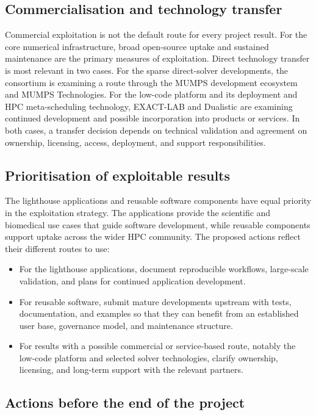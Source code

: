 \documentclass[a4paper,12pt]{article}
\begin{document}
\subsection{Commercialisation and technology transfer}

Commercial exploitation is not the default route for every project result.
For the core numerical infrastructure, broad open-source uptake and sustained
maintenance are the primary measures of exploitation. Direct technology
transfer is most relevant in two cases. For the sparse direct-solver
developments, the consortium is examining a route through the MUMPS
development ecosystem and MUMPS Technologies. For the low-code platform and
its deployment and HPC meta-scheduling technology, EXACT-LAB and Dualistic
are examining continued development and possible incorporation into products
or services. In both cases, a transfer decision depends on technical
validation and agreement on ownership, licensing, access, deployment, and
support responsibilities.

\subsection{Prioritisation of exploitable results}

The lighthouse applications and reusable software components have equal
priority in the exploitation strategy. The applications provide the
scientific and biomedical use cases that guide software development, while
reusable components support uptake across the wider HPC community. The
proposed actions reflect their different routes to use:
\begin{itemize}
  \item For the lighthouse applications, document reproducible workflows,
  large-scale validation, and plans for continued application development.
  \item For reusable software, submit mature developments upstream with
  tests, documentation, and examples so that they can benefit from an
  established user base, governance model, and maintenance structure.
  \item For results with a possible commercial or service-based route,
  notably the low-code platform and selected solver technologies, clarify
  ownership, licensing, and long-term support with the relevant partners.
\end{itemize}

\subsection{Actions before the end of the project}
\end{document}
